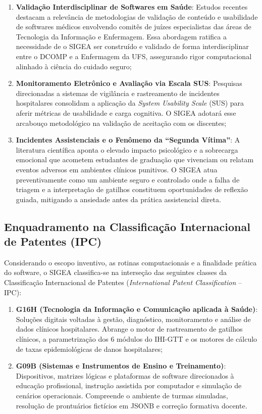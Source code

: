 \begin{enumerate}
    \item \textbf{Validação Interdisciplinar de Softwares em Saúde}: Estudos recentes destacam a relevância de metodologias de validação de conteúdo e usabilidade de softwares médicos envolvendo comitês de juízes especialistas das áreas de Tecnologia da Informação e Enfermagem. Essa abordagem ratifica a necessidade de o SIGEA ser construído e validado de forma interdisciplinar entre o DCOMP e a Enfermagem da UFS, assegurando rigor computacional alinhado à ciência do cuidado seguro;
    \item \textbf{Monitoramento Eletrônico e Avaliação via Escala SUS}: Pesquisas direcionadas a sistemas de vigilância e rastreamento de incidentes hospitalares consolidam a aplicação da \textit{System Usability Scale} (SUS) para aferir métricas de usabilidade e carga cognitiva. O SIGEA adotará esse arcabouço metodológico na validação de aceitação com os discentes;
    \item \textbf{Incidentes Assistenciais e o Fenômeno da ``Segunda Vítima''}: A literatura científica aponta o elevado impacto psicológico e a sobrecarga emocional que acometem estudantes de graduação que vivenciam ou relatam eventos adversos em ambientes clínicos punitivos. O SIGEA atua preventivamente como um ambiente seguro e controlado onde a falha de triagem e a interpretação de gatilhos constituem oportunidades de reflexão guiada, mitigando a ansiedade antes da prática assistencial direta.
\end{enumerate}

\subsection{Enquadramento na Classificação Internacional de Patentes (IPC)}
\label{subsec:classificacao-ipc}

Considerando o escopo inventivo, as rotinas computacionais e a finalidade prática do software, o SIGEA classifica-se na interseção das seguintes classes da Classificação Internacional de Patentes (\textit{International Patent Classification} -- IPC):

\begin{enumerate}
    \item \textbf{G16H (Tecnologia da Informação e Comunicação aplicada à Saúde)}: Soluções digitais voltadas à gestão, diagnóstico, monitoramento e análise de dados clínicos hospitalares. Abrange o motor de rastreamento de gatilhos clínicos, a parametrização dos 6 módulos do IHI-GTT e os motores de cálculo de taxas epidemiológicas de danos hospitalares;
    \item \textbf{G09B (Sistemas e Instrumentos de Ensino e Treinamento)}: Dispositivos, matrizes lógicas e plataformas de software direcionados à educação profissional, instrução assistida por computador e simulação de cenários operacionais. Compreende o ambiente de turmas simuladas, resolução de prontuários fictícios em JSONB e correção formativa docente.
\end{enumerate}

